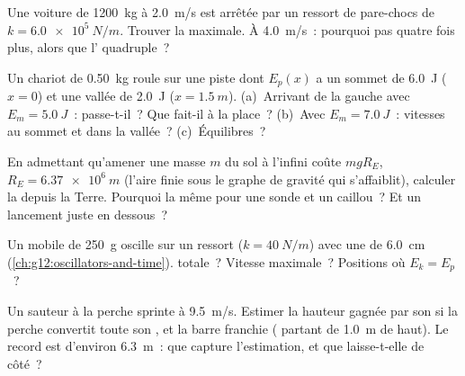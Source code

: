 \begin{exercise}[$\star\star$]\label{exo:g12:work-and-energy:11}
Une voiture de \qty{1200}{kg} à \qty{2.0}{m/s} est arrêtée par un
ressort de pare-chocs de 
$k = \qty{6.0e5}{N/m}$. Trouver la  maximale. À
\qty{4.0}{m/s}~: pourquoi pas quatre fois plus, alors que
l' quadruple~?
\end{exercise}

\begin{exercise}[$\star\star\star$]\label{exo:g12:work-and-energy:12}
Un chariot de \qty{0.50}{kg} roule sur une piste dont $E_p(x)$ a un
sommet de \qty{6.0}{J} ($x = 0$) et une vallée de \qty{2.0}{J}
($x = \qty{1.5}{m}$). (a)~Arrivant de la gauche avec
$E_m = \qty{5.0}{J}$~: passe-t-il~? Que fait-il à la place~?
(b)~Avec $E_m = \qty{7.0}{J}$~: vitesses au sommet et dans la
vallée~? (c)~Équilibres~?
\end{exercise}

\begin{exercise}[$\star\star\star$]\label{exo:g12:work-and-energy:13}
En admettant qu'amener une masse $m$ du sol à l'infini coûte
$mgR_E$, $R_E = \qty{6.37e6}{m}$ (l'aire finie sous le graphe de
gravité qui s'affaiblit), calculer la \emph{} depuis la Terre. Pourquoi la même pour une sonde et
un caillou~? Et un lancement juste en dessous~?
\end{exercise}

\begin{exercise}[$\star\star\star$]\label{exo:g12:work-and-energy:14}
Un mobile de \qty{250}{g} oscille sur un ressort
($k = \qty{40}{N/m}$) avec une  de
\qty{6.0}{cm} (\cref{ch:g12:oscillators-and-time}).
 totale~? Vitesse maximale~? Positions où
$E_k = E_p$~?
\end{exercise}

\begin{exercise}[$\star\star\star$]\label{exo:g12:work-and-energy:15}
Un sauteur à la perche sprinte à \qty{9.5}{m/s}. Estimer la hauteur
gagnée par son  si la perche convertit toute son
, et la barre franchie ( partant de \qty{1.0}{m} de haut). Le record est d'environ
\qty{6.3}{m}~: que capture l'estimation, et que laisse-t-elle de
côté~?
\end{exercise}

